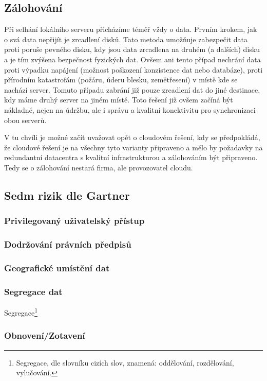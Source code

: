 \subsection{Zálohování}
Při selhání lokálního serveru přicházíme téměř vždy o data. Prvním krokem, jak o svá data nepřijít je zrcadlení disků. Tato metoda umožňuje zabezpečit data proti poruše pevného disku, kdy jsou data zrcadlena na druhém (a dalších) disku a je tím zvýšena bezpečnost fyzických dat. Ovšem ani tento případ nechrání data proti výpadku napájení (možnost poškození konzistence dat nebo databáze), proti přírodním katastrofám (požáru, úderu blesku, zemětřesení) v místě kde se nachází server. Tomuto případu zabrání již pouze zrcadlení dat do jiné destinace, kdy máme druhý server na jiném místě. Toto řešení již ovšem začíná být nákladné, nejen na údržbu, ale i správu a kvalitní konektivitu pro synchronizaci obou serverů.

V tu chvíli je možné začít uvažovat opět o cloudovém řešení, kdy se předpokládá, že cloudové řešení je na všechny tyto varianty připraveno a mělo by požadavky na redundantní datacentra s kvalitní infrastrukturou a zálohováním být připraveno. Tedy se o zálohování nestará firma, ale provozovatel cloudu.\nocite{podnikatel:zalohovani}


\subsection{Sedm rizik dle Gartner}
\subsubsection{Privilegovaný uživatelský přístup}
\subsubsection{Dodržování právních předpisů}
\subsubsection{Geografické umístění dat}
\subsubsection{Segregace dat}
Segregace\footnote{Segregace, dle slovníku cizích slov, znamená: oddělování, rozdělování, vylučování.}
\subsubsection{Obnovení/Zotavení}
